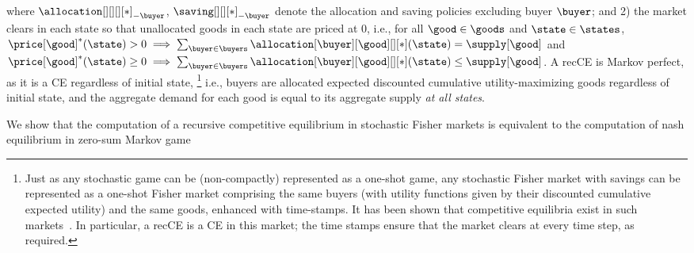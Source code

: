 where $\allocation[][][][*]_{-\buyer}$, $\saving[][][*]_{-\buyer}$ denote the 
allocation and saving policies excluding buyer $\buyer$; and
2) the market clears in each state so that unallocated goods in each state are priced at 0, i.e., for all $\good \in \goods$ and $\state \in \states$,
$    
        \price[\good]^*(\state) > 0 \implies \sum_{\buyer \in \buyers} \allocation[\buyer][\good][][*](\state) = \supply[\good]
$ and
$
        \price[\good]^*(\state) \geq 0 \implies \sum_{\buyer \in \buyers} \allocation[\buyer][\good][][*](\state) \leq \supply[\good]
$.
A recCE is Markov perfect, as it is a CE regardless of initial  state,%
\footnote{Just as any stochastic game can be (non-compactly) represented as a one-shot game, any stochastic Fisher market with savings can be represented as a one-shot Fisher market comprising the same buyers (with utility functions given by their discounted cumulative expected utility) 
and the same goods, enhanced with time-stamps.
It has been shown that competitive equilibria exist in such markets~\citep{prescott1972note}.
In particular, a recCE is a CE in this market; the time stamps ensure that the market clears at every time step, as required.}
i.e., buyers are allocated expected discounted cumulative utility-maximizing goods regardless of initial state, and the aggregate demand for each good is equal to its aggregate supply \emph{at all states}.

We show that the computation of a recursive competitive equilibrium in stochastic Fisher markets is equivalent to the computation of nash equilibrium in zero-sum Markov game